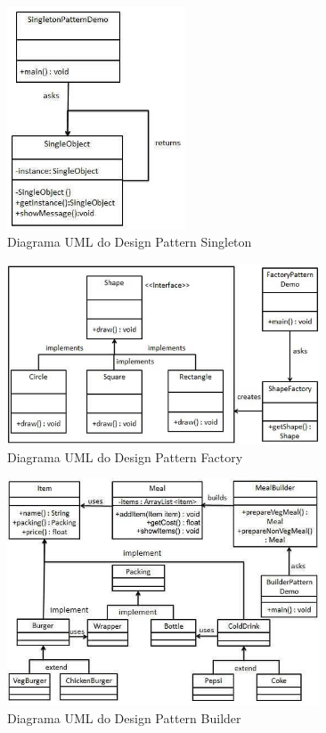 \begin{figure}[H]
	\centering
	\includegraphics[width = 200px]{figuras/singleton_pattern_uml_diagram}
	\caption {Diagrama UML do Design Pattern Singleton}
	\label{fig:dp_singleton}
\end{figure}
\begin{figure}[H]
	\centering
	\includegraphics[width = 350px]{figuras/factory_pattern_uml_diagram}
	\caption {Diagrama UML do Design Pattern Factory}
	\label{fig:dp_factory}
\end{figure}
\begin{figure}[H]
	\centering
	\includegraphics[width = 350px]{figuras/builder_pattern_uml_diagram}
	\caption {Diagrama UML do Design Pattern Builder}
	\label{fig:dp_builder}
\end{figure}
